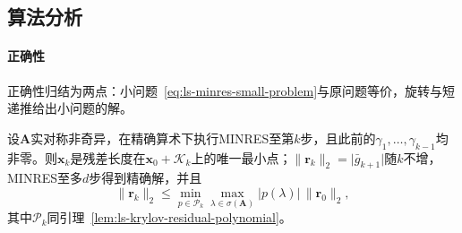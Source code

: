 \subsection{算法分析}

\paragraph{正确性}
正确性归结为两点：小问题~\eqref{eq:ls-minres-small-problem}与原问题等价，旋转与短递推给出小问题的解。

\begin{theorem}[MINRES的最小残差性]
\label{thm:ls-minres-optimality}
设$\bm A$实对称非奇异，在精确算术下执行MINRES至第$k$步，且此前的$\gamma_1,\ldots,\gamma_{k-1}$均非零。则$\bm x_k$是残差长度在$\bm x_0+\mathcal K_k$上的唯一最小点；$\lVert\bm r_k\rVert_2=\lvert\bar g_{k+1}\rvert$随$k$不增，MINRES至多$d$步得到精确解，并且
\begin{equation}
 \lVert\bm r_k\rVert_2\le\min_{p\in\mathcal P_k}\max_{\lambda\in\sigma(\bm A)}\lvert p(\lambda)\rvert\,\lVert\bm r_0\rVert_2 ,
 \label{eq:ls-minres-residual-bound}
\end{equation}
其中$\mathcal P_k$同引理~\ref{lem:ls-krylov-residual-polynomial}。
\end{theorem}

